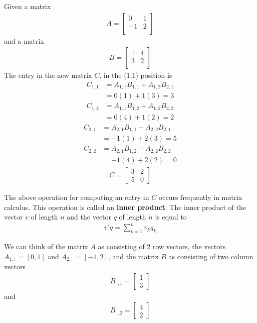 \ex Given a matrix \begin{align}
    A = \begin{bmatrix}
           0 & 1 \\ 
           -1 & 2 \\ 
        \end{bmatrix}
\end{align} and a matrix 
 \begin{align}
    B = \begin{bmatrix}
           1 & 4 \\ 
           3 & 2 \\ 
        \end{bmatrix}
\end{align}
The entry in the new matrix $C$, in the (1,1) position is 
\begin{align}
    C_{1,1} &= A_{1,1} B_{1,1} + A_{1,2} B_{2,1}\\
            &= 0 (1) + 1 (3) = 3
\end{align}
\begin{align}
    C_{1,2} &= A_{1,1} B_{1,2} + A_{1,2} B_{2,2}\\
            &= 0 (4) + 1 (2) = 2
\end{align}
\begin{align}
    C_{2,1} &= A_{2,1} B_{1,1} + A_{2,2} B_{2,1}\\
            &= -1 (1) + 2 (3) = 5
\end{align}
\begin{align}
    C_{2,2} &= A_{2,1} B_{1,2} + A_{2,2} B_{2,2}\\
            &= -1 (4) + 2 (2) = 0
\end{align}
\begin{align}
    C = \begin{bmatrix}
        3 & 2 \\ 
        5 & 0
        \end{bmatrix}
\end{align}

The above operation for computing an entry in $C$ occurs frequently in matrix calculus. 
This operation is called an \textbf{inner product}. 
The inner product of the vector $v$ of length $n$ and the vector $q$ of length $n$ is equal to 
\begin{align}
    v'q = \sum_{k=1}^{n} v_{k}q_{k}
\end{align}

We can think of the matrix $A$ as consisting of $2$ row vectors, the vectors $A_{1,:} = [0,1]$ and $A_{2,:} = [-1, 2]$, and the matrix $B$ as consisting of two column vectors 
\begin{align}
    B_{:,1} = \begin{bmatrix}
          1 \\
          3
    \end{bmatrix}
\end{align} 
and 
\begin{align}
    B_{:,2} = \begin{bmatrix}
          4 \\
          2
    \end{bmatrix}
\end{align}

